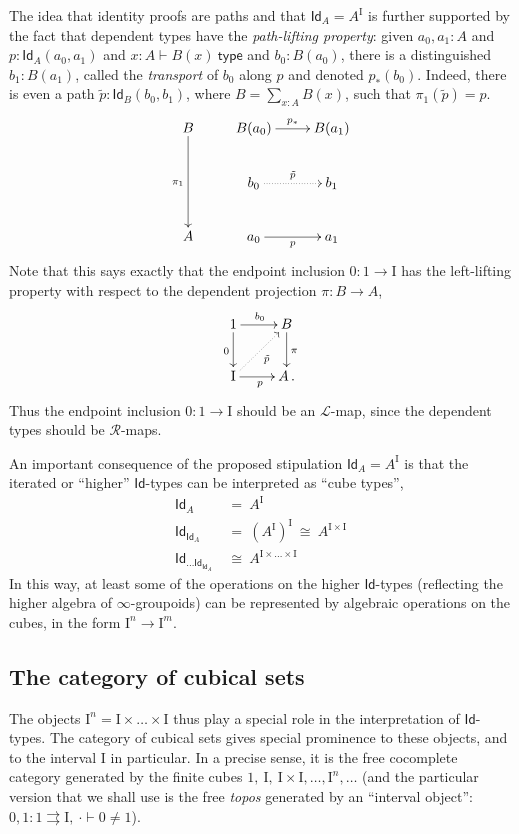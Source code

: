 \documentclass[12pt]{article}
\renewcommand{\L}{\ensuremath{\mathcal{L}}}
\newcommand{\R}{\ensuremath{\mathcal{R}}}
\newcommand{\I}{\ensuremath{\mathrm{I}}}
\newcommand{\type}{\mathsf{type}}
\newcommand{\types}[2]{#1 \vdash #2\ \type}
\newcommand{\Id}{\ensuremath{\mathsf{Id}}}
\newcommand{\id}[1]{\Id_{#1}}
\theoremstyle{remark}
\theoremstyle{definition}
\begin{document}
The idea that identity proofs are paths and that $\id{A} = A^\I$ is further supported by the fact that dependent types have the \emph{path-lifting property}: given $a_0,a_1:A$  and $p:\id{A}(a_0,a_1)$ and $\types{x:A}{B(x)}$  and $b_0:B(a_0)$, there is a distinguished $b_1:B(a_1)$, called the \emph{transport} of $b_0$ along $p$ and denoted $p_*(b_0)$.  Indeed, there is even a path $\tilde{p} : \id{B}(b_0,b_1)$, where $B=\sum_{x:A}B(x)$, such that $\pi_1(\tilde{p})=p$.
\[
\xymatrix{
B \ar[dd]_{\pi_1} & B(a_0) \ar[r]^{p_*} & B(a_1) \\
   	& b_0 \ar@{..>}[r]^{\tilde{p} } & b_1  \\
A  	&	a_0 \ar[r]_{p} &  a_1
}
\]
%
Note that this says exactly that the endpoint inclusion $0 : 1\to \I$ has the left-lifting property with respect to the dependent projection $\pi:B\to A$,
\[
\xymatrix{
1 \ar[d]_{0} \ar[r]^{b_0} & B \ar[d]^{\pi} \\
\I \ar[r]_{p} \ar@{..>}[ru]_{\tilde{p}} & A\,.
}
\]
Thus the endpoint inclusion $0 : 1\to \I$ should be an $\L$-map, since the dependent types should be $\R$-maps.

An important consequence of the proposed stipulation $\id{A} = A^\I$ is that the iterated or ``higher'' \Id-types can be interpreted as ``cube types'',
\begin{align*}
\id{A}\ &=\ A^\I \\
\id{\id{A}}\ &=\ (A^\I)^\I\ \cong\ A^{\I\times\I} \\
\id{\dots\id{\id{A}}}\ &\cong\ A^{\I\times\dots\times\I}
\end{align*}
%
In this way, at least some of the operations on the higher \Id-types (reflecting the higher algebra of $\infty$-groupoids) can be represented by algebraic operations on the cubes, in the form $\I^n \to \I^m$.

\subsection{The category of cubical sets}

The objects $\I^n = \I\times \dots\times \I$ thus play a special role in the  interpretation of \Id-types.  The category of cubical sets gives special prominence to these objects, and to the interval $\I$ in particular.  In a precise sense, it is the free cocomplete category generated by the finite cubes $1,\ \I,\ \I\times\I, \dots, \I^n, \dots$ (and the particular version that we shall use is the free \emph{topos} generated by an ``interval object'': $0,1 : 1\rightrightarrows \I,\ \cdot\vdash 0\neq 1$).
\end{document}
